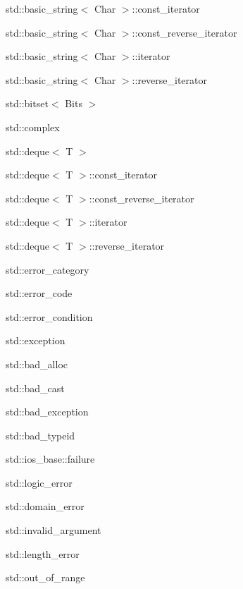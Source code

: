 \begin{DoxyCompactList}
\item std\+:\+:basic\+\_\+string$<$ Char $>$\+:\+:const\+\_\+iterator\item std\+:\+:basic\+\_\+string$<$ Char $>$\+:\+:const\+\_\+reverse\+\_\+iterator\item std\+:\+:basic\+\_\+string$<$ Char $>$\+:\+:iterator\item std\+:\+:basic\+\_\+string$<$ Char $>$\+:\+:reverse\+\_\+iterator\item std\+:\+:bitset$<$ Bits $>$\item std\+:\+:complex\item std\+:\+:deque$<$ T $>$\item std\+:\+:deque$<$ T $>$\+:\+:const\+\_\+iterator\item std\+:\+:deque$<$ T $>$\+:\+:const\+\_\+reverse\+\_\+iterator\item std\+:\+:deque$<$ T $>$\+:\+:iterator\item std\+:\+:deque$<$ T $>$\+:\+:reverse\+\_\+iterator\item std\+:\+:error\+\_\+category\item std\+:\+:error\+\_\+code\item std\+:\+:error\+\_\+condition\item std\+:\+:exception\begin{DoxyCompactList}
\item {}
\begin{DoxyCompactList}
\item {}
\end{DoxyCompactList}
\item std\+:\+:bad\+\_\+alloc\item std\+:\+:bad\+\_\+cast\item std\+:\+:bad\+\_\+exception\item std\+:\+:bad\+\_\+typeid\item std\+:\+:ios\+\_\+base\+:\+:failure\item std\+:\+:logic\+\_\+error\begin{DoxyCompactList}
\item std\+:\+:domain\+\_\+error\item std\+:\+:invalid\+\_\+argument\item std\+:\+:length\+\_\+error\item std\+:\+:out\+\_\+of\+\_\+range\end{DoxyCompactList}

\end{DoxyCompactList}
\end{DoxyCompactList}
